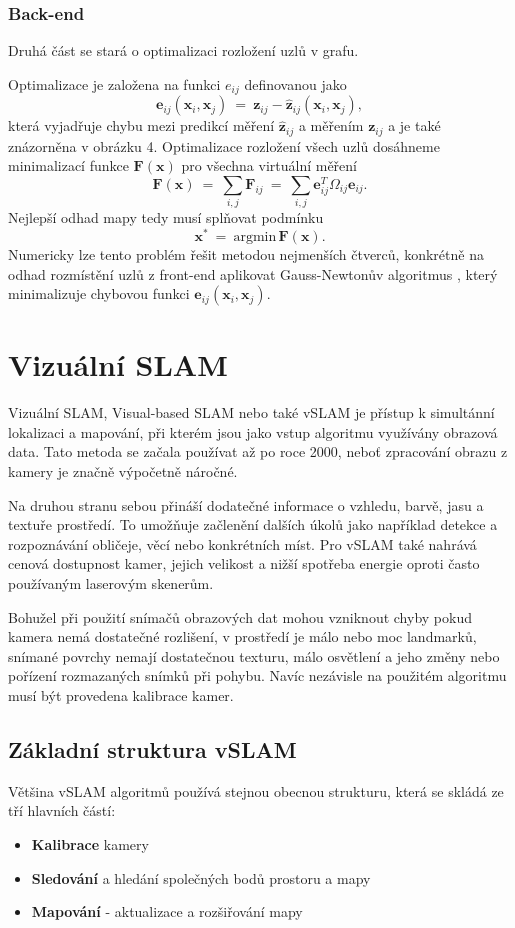 \documentclass[12pt,a4paper]{report}
\begin{document}
\subsection{Back-end}
Druhá část se stará o optimalizaci rozložení uzlů v grafu.

Optimalizace je založena na funkci \(e_{ij}\) definovanou jako
$$
\textbf{e}_{ij}(\textbf{x}_i, \textbf{x}_j) \: = \: \textbf{z}_{ij}-\hat{\textbf{z}}_{ij}(\textbf{x}_i, \textbf{x}_j),
$$
která vyjadřuje chybu mezi predikcí měření $\hat{\textbf{z}}_{ij}$ a měřením $\textbf{z}_{ij}$ a je také znázorněna v obrázku 4. Optimalizace rozložení všech uzlů dosáhneme minimalizací funkce $\textbf{F}(\textbf{x})$ pro všechna virtuální měření
$$
\textbf{F}(\textbf{x}) \: = \: \sum\limits_{i,j} \textbf{F}_{ij} \: = \: \sum\limits_{i,j} \textbf{e}_{ij}^T \Omega_{ij} \textbf{e}_{ij}.
$$
Nejlepší odhad mapy tedy musí splňovat podmínku
$$
\textbf{x}^* \: = \: \text{argmin}\, \textbf{F}(\textbf{x}).
$$
Numericky lze tento problém řešit metodou nejmenších čtverců, konkrétně na odhad rozmístění uzlů z front-end aplikovat Gauss-Newtonův algoritmus \cite{gauss-newton}, který minimalizuje chybovou funkci $\textbf{e}_{ij}(\textbf{x}_i, \textbf{x}_j)$.


\chapter{Vizuální SLAM}
Vizuální SLAM, Visual-based SLAM nebo také vSLAM je přístup k simultánní lokalizaci a mapování, při kterém jsou jako vstup algoritmu využívány obrazová data. Tato metoda se začala používat až po roce 2000, neboť zpracování obrazu z kamery je značně výpočetně náročné. 

Na druhou stranu sebou přináší dodatečné informace o vzhledu, barvě, jasu a textuře prostředí. To umožňuje začlenění dalších úkolů jako například detekce a rozpoznávání obličeje, věcí nebo konkrétních míst. Pro vSLAM také nahrává cenová dostupnost kamer, jejich velikost a nižší spotřeba energie oproti často používaným laserovým skenerům. 

Bohužel při použití snímačů obrazových dat mohou vzniknout chyby pokud kamera nemá dostatečné rozlišení, v prostředí je málo nebo moc landmarků, snímané povrchy nemají dostatečnou texturu, málo osvětlení a jeho změny nebo pořízení rozmazaných snímků při pohybu. Navíc nezávisle na použitém algoritmu musí být provedena kalibrace kamer.

\section{Základní struktura vSLAM}
Většina vSLAM algoritmů používá stejnou obecnou strukturu, která se skládá ze tří hlavních částí:
\begin{itemize}
\item \textbf{Kalibrace} kamery 
\item \textbf{Sledování} a hledání společných bodů prostoru a mapy
\item \textbf{Mapování} - aktualizace a rozšiřování mapy
\end{itemize}
\end{document}
